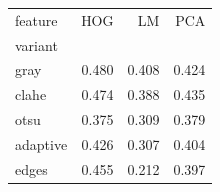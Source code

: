 \begin{tabular}{lrrr}
\toprule
feature & HOG & LM & PCA \\
variant &  &  &  \\
\midrule
gray & 0.480 & 0.408 & 0.424 \\
clahe & 0.474 & 0.388 & 0.435 \\
otsu & 0.375 & 0.309 & 0.379 \\
adaptive & 0.426 & 0.307 & 0.404 \\
edges & 0.455 & 0.212 & 0.397 \\
\bottomrule
\end{tabular}
